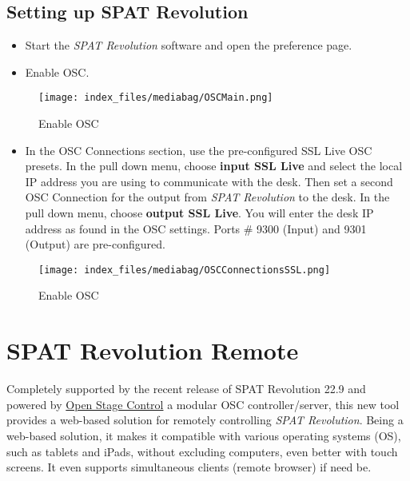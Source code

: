 \documentclass[
  letterpaper,
  DIV=11,
  numbers=noendperiod]{scrreport}
\providecommand{\tightlist}{%
  \setlength{\itemsep}{0pt}\setlength{\parskip}{0pt}}\usepackage{longtable,booktabs,array}
\begin{document}
\hypertarget{setting-up-spat-revolution}{%
\section{Setting up SPAT Revolution}\label{setting-up-spat-revolution}}

\begin{itemize}
\tightlist
\item
  Start the \emph{SPAT Revolution} software and open the preference
  page.
\item
  Enable OSC.
\end{itemize}

\begin{figure}

{\centering \texttt{[image: index\_files/mediabag/OSCMain.png]}

}

\caption{Enable OSC}

\end{figure}

\begin{itemize}
\tightlist
\item
  In the OSC Connections section, use the pre-configured SSL Live OSC
  presets. In the pull down menu, choose \textbf{input \textbar SSL
  Live} and select the local IP address you are using to communicate
  with the desk. Then set a second OSC Connection for the output from
  \emph{SPAT Revolution} to the desk. In the pull down menu, choose
  \textbf{output \textbar{} SSL Live}. You will enter the desk IP
  address as found in the OSC settings. Ports \# 9300 (Input) and 9301
  (Output) are pre-configured.
\end{itemize}

\begin{figure}

{\centering \texttt{[image: index\_files/mediabag/OSCConnectionsSSL.png]}

}

\caption{Enable OSC}

\end{figure}

\hypertarget{spat-revolution-remote}{%
\chapter{SPAT Revolution Remote}\label{spat-revolution-remote}}

Completely supported by the recent release of SPAT Revolution 22.9 and
powered by \href{https://openstagecontrol.ammd.net/}{Open Stage Control}
a modular OSC controller/server, this new tool provides a web-based
solution for remotely controlling \emph{SPAT Revolution}. Being a
web-based solution, it makes it compatible with various operating
systems (OS), such as tablets and iPads, without excluding computers,
even better with touch screens. It even supports simultaneous clients
(remote browser) if need be.
\end{document}
